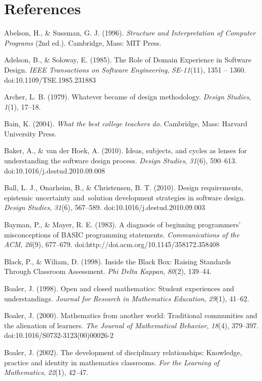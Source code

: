 \section{References}\label{references}

Abelson, H., \& Sussman, G. J. (1996). \emph{Structure and
Interpretation of Computer Programs} (2nd ed.). Cambridge, Mass: MIT
Press.

Adelson, B., \& Soloway, E. (1985). The Role of Domain Experience in
Software Design. \emph{IEEE Transactions on Software Engineering},
\emph{SE-11}(11), 1351 -- 1360. doi:10.1109/TSE.1985.231883

Archer, L. B. (1979). Whatever became of design methodology.
\emph{Design Studies}, \emph{1}(1), 17--18.

Bain, K. (2004). \emph{What the best college teachers do}. Cambridge,
Mass: Harvard University Press.

Baker, A., \& van der Hoek, A. (2010). Ideas, subjects, and cycles as
lenses for understanding the software design process. \emph{Design
Studies}, \emph{31}(6), 590--613. doi:10.1016/j.destud.2010.09.008

Ball, L. J., Onarheim, B., \& Christensen, B. T. (2010). Design
requirements, epistemic uncertainty and~solution development strategies
in software design. \emph{Design Studies}, \emph{31}(6), 567--589.
doi:10.1016/j.destud.2010.09.003

Bayman, P., \& Mayer, R. E. (1983). A diagnosis of beginning
programmers' misconceptions of BASIC programming statements.
\emph{Communications of the ACM}, \emph{26}(9), 677--679.
doi:http://doi.acm.org/10.1145/358172.358408

Black, P., \& Wiliam, D. (1998). Inside the Black Box: Raising Standards
Through Classroom Assessment. \emph{Phi Delta Kappan}, \emph{80}(2),
139--44.

Boaler, J. (1998). Open and closed mathematics: Student experiences and
understandings. \emph{Journal for Research in Mathematics Education},
\emph{29}(1), 41--62.

Boaler, J. (2000). Mathematics from another world: Traditional
communities and the alienation of learners. \emph{The Journal of
Mathematical Behavior}, \emph{18}(4), 379--397.
doi:10.1016/S0732-3123(00)00026-2

Boaler, J. (2002). The development of disciplinary relationships:
Knowledge, practice and identity in mathematics classrooms. \emph{For
the Learning of Mathematics}, \emph{22}(1), 42--47.

